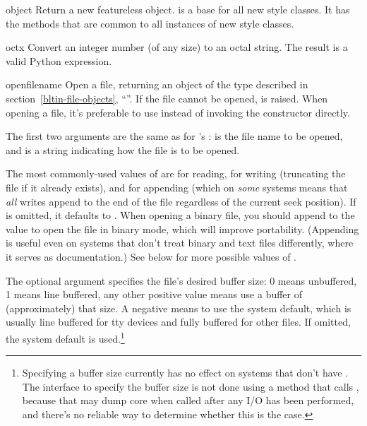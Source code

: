 \begin{funcdesc}{object}{}
  Return a new featureless object.   is a base
  for all new style classes.  It has the methods that are common
  to all instances of new style classes.

\end{funcdesc}

\begin{funcdesc}{oct}{x}
  Convert an integer number (of any size) to an octal string.  The
  result is a valid Python expression.
\end{funcdesc}

\begin{funcdesc}{open}{filename}
  Open a file, returning an object of the  type described
  in section~\ref{bltin-file-objects}, ``''.  If the file cannot be opened,
   is raised.  When opening a file, it's
  preferable to use  instead of invoking the
   constructor directly.

  The first two arguments are the same as for 's
  :  is the file name to be opened,
  and  is a string indicating how the file is to be opened.

  The most commonly-used values of  are  for
  reading,  for writing (truncating the file if it already
  exists), and  for appending (which on \emph{some} \UNIX{}
  systems means that \emph{all} writes append to the end of the file
  regardless of the current seek position).  If  is omitted,
  it defaults to .  When opening a binary file, you should
  append  to the  value to open the file in binary
  mode, which will improve portability.  (Appending  is
  useful even on systems that don't treat binary and text files
  differently, where it serves as documentation.)  See below for more
  possible values of .

  The optional  argument specifies the
  file's desired buffer size: 0 means unbuffered, 1 means line
  buffered, any other positive value means use a buffer of
  (approximately) that size.  A negative  means to use
  the system default, which is usually line buffered for tty
  devices and fully buffered for other files.  If omitted, the system
  default is used.\footnote{
    Specifying a buffer size currently has no effect on systems that
    don't have .  The interface to specify the
    buffer size is not done using a method that calls
    , because that may dump core when called
    after any I/O has been performed, and there's no reliable way to
    determine whether this is the case.}


\end{funcdesc}

